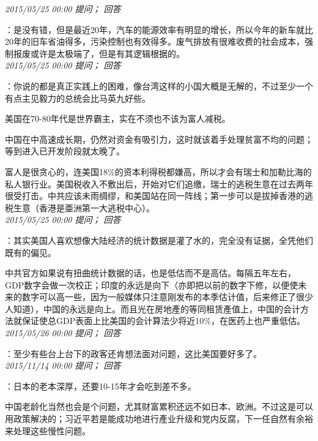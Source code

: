 \documentclass[twocolumn]{ctexart}
\begin{document}
\textit{\hfill\noindent\small 2015/05/25 00:00 提问； 回答}

：是没有错，但是最近20年，汽车的能源效率有明显的增长，所以今年的新车就比20年的旧车省油得多，污染控制也有效得多。废气排放有很难收费的社会成本，强制报废或许是太极端了，但是有其逻辑根据的。\\

\textit{\hfill\noindent\small 2015/05/25 00:00 提问； 回答}

：你说的都是真正实践上的困难，像台湾这样的小国大概是无解的，不过至少一个有点主见毅力的总统会比马英九好些。

美国在70-80年代是世界霸主，实在不须也不该为富人减税。

中国在中高速成长期，仍然对资金有吸引力，这时就该着手处理贫富不均的问题；等到进入已开发阶段就太晚了。

富人是很贪心的，连美国18\%的资本利得税都嫌高，所以才会有瑞士和加勒比海的私人银行业。美国税收入不敷出后，开始对它们追缴，瑞士的逃税生意在过去两年很受打击。中共应该未雨绸缪，和美国站在同一阵线；第一步可以是拔掉香港的逃税生意（香港是亜洲第一大逃税中心）。\\

\textit{\hfill\noindent\small 2015/05/25 00:00 提问； 回答}

：其实美国人喜欢想像大陆经济的统计数据是灌了水的，完全没有证据，全凭他们既有的偏见。

中共官方如果说有扭曲统计数据的话，也是低估而不是高估。每隔五年左右，GDP数字会做一次校正；印度的永远是向下（亦即把以前的数字下修，以便使未来的数字可以高一些，因为一般媒体只注意刚发布的本季估计值，后来修正了很少人知道），中国的永远是向上。而且光在房地產的等同租赁產值上，中国的会计方法就保证使总GDP表面上比美国的会计算法少将近10\%，在医药上也严重低估。\\

\textit{\hfill\noindent\small 2015/05/26 00:00 提问； 回答}

：至少有些台上台下的政客还肯想法面对问题，这比美国要好多了。\\

\textit{\hfill\noindent\small 2015/11/14 00:00 提问； 回答}

：日本的老本深厚，还要10-15年才会吃到差不多。

中国老龄化当然也会是个问题，尤其财富累积还远不如日本、欧洲。不过这是可以用政策解决的；习近平若是能成功地进行產业升级和党内反腐，下一任自然有余裕来处理这些慢性问题。\\
\end{document}
